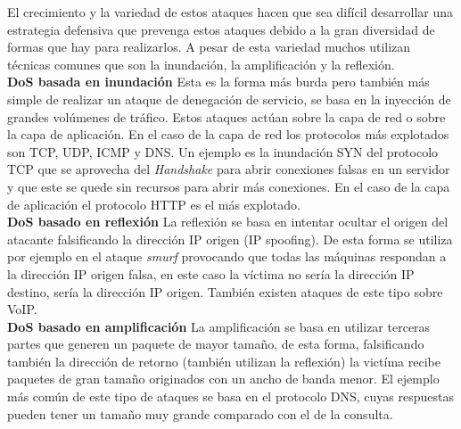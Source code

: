 El crecimiento y la variedad de estos ataques hacen que sea difícil desarrollar una estrategia defensiva que prevenga estos ataques debido a la gran diversidad de formas que hay para realizarlos. A pesar de esta variedad muchos utilizan técnicas comunes que son la inundación, la amplificación y la reflexión. \\

\textbf{DoS basada en inundación}
Esta es la forma más burda pero también más simple de realizar un ataque de denegación de servicio, se basa en la inyección de grandes volúmenes de tráfico. Estos ataques actúan sobre la capa de red o sobre la capa de aplicación. En el caso de la capa de red los protocolos más explotados son TCP, UDP, ICMP y DNS\cite{douligeris:2004}. Un ejemplo es la inundación SYN del protocolo TCP que se aprovecha del \textit{Handshake} para abrir conexiones falsas en un servidor y que este se quede sin recursos para abrir más conexiones. En el caso de la capa de aplicación el protocolo HTTP es el más explotado. \\

\textbf{DoS basado en reflexión}
La reflexión se basa en intentar ocultar el origen del atacante falsificando la dirección IP origen (IP spoofing). De esta forma se utiliza por ejemplo en el ataque \textit{smurf} provocando que todas las máquinas respondan a la dirección IP origen falsa, en este caso la víctima no sería la dirección IP destino, sería la dirección IP origen. También existen ataques de este tipo sobre VoIP\cite{voip:2008}. \\

\textbf{DoS basado en amplificación}
La amplificación se basa en utilizar terceras partes que generen un paquete de mayor tama\~no, de esta forma, falsificando también la dirección de retorno (también utilizan la reflexión) la victíma recibe paquetes de gran tama\~no originados con un ancho de banda menor. El ejemplo más común de este tipo de ataques se basa en el protocolo DNS, cuyas respuestas pueden tener un tama\~no muy grande comparado con el de la consulta\cite{dns:2013}. 
